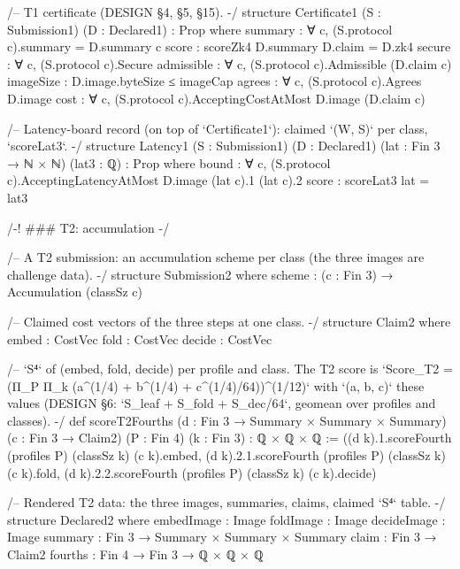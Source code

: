 \begin{leancode}[fontsize=\scriptsize,label={\footnotesize Contract/Certificate.lean}]
/-- T1 certificate (DESIGN §4, §5, §15). -/
structure Certificate1 (S : Submission1) (D : Declared1) : Prop where
  summary : ∀ c, (S.protocol c).summary = D.summary c
  score : scoreZk4 D.summary D.claim = D.zk4
  secure : ∀ c, (S.protocol c).Secure
  admissible : ∀ c, (S.protocol c).Admissible (D.claim c)
  imageSize : D.image.byteSize ≤ imageCap
  agrees : ∀ c, (S.protocol c).Agrees D.image
  cost : ∀ c, (S.protocol c).AcceptingCostAtMost D.image (D.claim c)

/-- Latency-board record (on top of `Certificate1`): claimed `(W, S)` per class, `scoreLat3`. -/
structure Latency1 (S : Submission1) (D : Declared1) (lat : Fin 3 → ℕ × ℕ) (lat3 : ℚ) : Prop where
  bound : ∀ c, (S.protocol c).AcceptingLatencyAtMost D.image (lat c).1 (lat c).2
  score : scoreLat3 lat = lat3

/-! ### T2: accumulation -/

/-- A T2 submission: an accumulation scheme per class (the three images are challenge data). -/
structure Submission2 where
  scheme : (c : Fin 3) → Accumulation (classSz c)

/-- Claimed cost vectors of the three steps at one class. -/
structure Claim2 where
  embed : CostVec
  fold : CostVec
  decide : CostVec

/-- `S⁴` of (embed, fold, decide) per profile and class. The T2 score is
`Score_T2 = (Π_P Π_k (a^(1/4) + b^(1/4) + c^(1/4)/64))^(1/12)` with `(a, b, c)` these values
(DESIGN §6: `S_leaf + S_fold + S_dec/64`, geomean over profiles and classes). -/
def scoreT2Fourths (d : Fin 3 → Summary × Summary × Summary) (c : Fin 3 → Claim2) (P : Fin 4) (k : Fin 3) :
    ℚ × ℚ × ℚ :=
  ((d k).1.scoreFourth (profiles P) (classSz k) (c k).embed,
    (d k).2.1.scoreFourth (profiles P) (classSz k) (c k).fold,
    (d k).2.2.scoreFourth (profiles P) (classSz k) (c k).decide)

/-- Rendered T2 data: the three images, summaries, claims, claimed `S⁴` table. -/
structure Declared2 where
  embedImage : Image
  foldImage : Image
  decideImage : Image
  summary : Fin 3 → Summary × Summary × Summary
  claim : Fin 3 → Claim2
  fourths : Fin 4 → Fin 3 → ℚ × ℚ × ℚ


\end{leancode}
